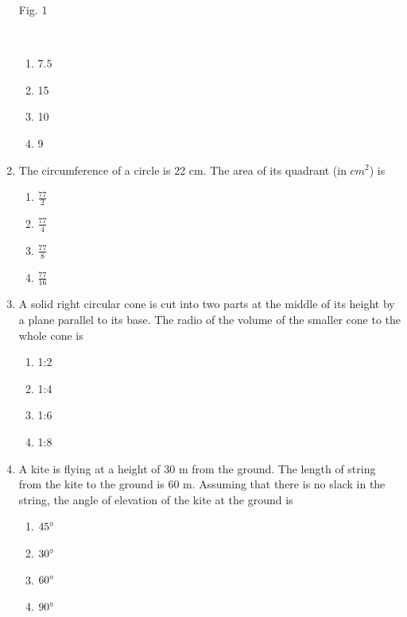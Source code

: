 \documentclass[journal,12pt,twocolumn]{IEEEtran}
\renewcommand\thesection{\arabic{section}}
\begin{document}
\begin{enumerate}[label=\thesection.\arabic*.,ref=\thesection.\theenumi]
{\caption{Fig. 1}\\}
\label{fig1}
 \begin{enumerate}[A]
    \item $7.5$\\
    \item 15 \\
    \item 10 \\
    \item 9
 \end{enumerate}
\item The circumference of a circle is 22 cm. The area of its quadrant (in $cm^2$) is
 \begin{enumerate}[A]
    \item $\frac{77}{2}$\\
    \item $\frac{77}{4}$\\
    \item $\frac{77}{8}$\\
    \item $\frac{77}{16}$\\
 \end{enumerate}
 \item A solid right circular cone is cut into two parts at the middle of its height by a plane parallel to its base. The radio of the volume of the smaller cone to the whole cone is
 \begin{enumerate}[A]
    \item 1:2 \\
    \item 1:4 \\ 
    \item 1:6 \\
    \item 1:8 \\
 \end{enumerate}
\item A kite is flying at a height of 30 m from the ground. The length of string from the kite to the ground is 60 m. Assuming that there is no slack in the string, the angle of elevation of the kite at the ground is
\begin{enumerate}[A]
    \item $45\degree$\\
    \item $30\degree$\\
    \item $60\degree$\\
    \item $90\degree$\\

\end{enumerate}
\end{enumerate}
\end{document}

